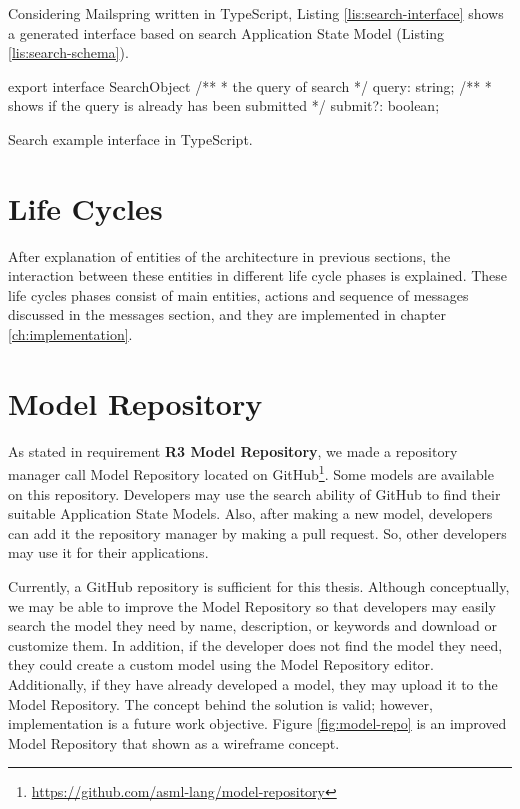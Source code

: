 Considering Mailspring written in TypeScript, Listing \ref{lis:search-interface} shows a generated interface based on search Application State Model (Listing \ref{lis:search-schema}).

\FloatBarrier
\begin{code}
\begin{js}
export interface SearchObject {
    /**
     * the query of search
     */
    query: string;
    /**
     * shows if the query is already has been submitted
     */
    submit?: boolean;
}
\end{js}
\caption{Search example interface in TypeScript.}
\label{lis:search-interface}
\end{code}
\FloatBarrier


\section{Life Cycles}
After explanation of entities of the architecture in previous sections, the interaction between these entities in different life cycle phases is explained. These life cycles phases consist of main entities, actions and sequence of messages discussed in the messages section, and they are implemented in chapter \ref{ch:implementation}. 



\section{Model Repository}

As stated in requirement \textbf{R3 Model Repository}, we made a repository manager call Model Repository located on GitHub\footnote{\url{https://github.com/asml-lang/model-repository}}. Some models are available on this repository. Developers may use the search ability of GitHub to find their suitable Application State Models. Also, after making a new model, developers can add it the repository manager by making a pull request. So, other developers may use it for their applications.

Currently, a GitHub repository is sufficient for this thesis. Although conceptually, we may be able to improve the Model Repository so that developers may easily search the model they need by name, description, or keywords and download or customize them. In addition, if the developer does not find the model they need, they could create a custom model using the Model Repository editor. Additionally, if they have already developed a model, they may upload it to the Model Repository. The concept behind the solution is valid; however, implementation is a future work objective. Figure \ref{fig:model-repo} is an improved Model Repository that shown as a wireframe concept.

